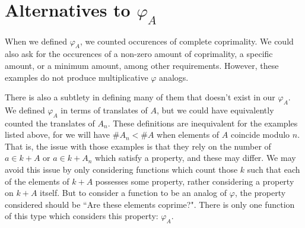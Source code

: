 \documentclass[11pt, leqno]{article}
\newtheorem{proposition}[theorem]{Proposition}
\begin{document}


\section{Alternatives to $\varphi_A$}
When we defined $\varphi_A$, we counted occurences of complete
coprimality.
We could also ask for the occurences of a non-zero amount of coprimality,
a specific amount, or a minimum amount, among other requirements.
However, these examples do not produce multiplicative $\varphi$ analogs.

There is also a subtlety in defining many of them that doesn't exist in
our $\varphi_A$. 
We defined $\varphi_A$ in terms of translates of $A$, but we could have equivalently
counted the translates of $A_n$.
These definitions are inequivalent for the examples listed above,
for we will have $\#A_n < \#A$ when elements of $A$ coincide modulo $n$.
That is, the issue with those examples is that they rely on the 
number of $a\in k+A$ or $a\in k+A_n$ which satisfy a property, and these
may differ. 
We may avoid this issue by only considering functions which
count those $k$ such that each of the elements of $k+A$ possesses
some property, rather considering a property on $k+A$ itself.
But to consider a function to be an analog of $\varphi$, the 
property considered should be ``Are these elements coprime?".
There is only one function of this type which considers
this property: $\varphi_A$.
\end{document}
